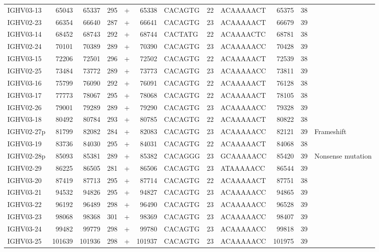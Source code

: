 \begin{tabular}{lrrrlrlllrrl}
  IGHV03-13 & 65043 & 65337 & 295 & + & 65338 & CACAGTG & 22 & ACAAAAACT & 65375 & 38 &  \\ 
  IGHV02-23 & 66354 & 66640 & 287 & + & 66641 & CACAGTG & 23 & ACAAAAACT & 66679 & 39 &  \\ 
  IGHV03-14 & 68452 & 68743 & 292 & + & 68744 & CACTATG & 22 & ACAAAACTC & 68781 & 38 &  \\ 
  IGHV02-24 & 70101 & 70389 & 289 & + & 70390 & CACAGTG & 23 & ACAAAAACC & 70428 & 39 &  \\ 
  IGHV03-15 & 72206 & 72501 & 296 & + & 72502 & CACAGTG & 22 & ACAAAAACT & 72539 & 38 &  \\ 
  IGHV02-25 & 73484 & 73772 & 289 & + & 73773 & CACAGTG & 23 & ACAAAAACC & 73811 & 39 &  \\ 
  IGHV03-16 & 75799 & 76090 & 292 & + & 76091 & CACAGTG & 22 & ACAAAAACT & 76128 & 38 &  \\ 
  IGHV03-17 & 77773 & 78067 & 295 & + & 78068 & CACAGTG & 22 & ACAAAAACT & 78105 & 38 &  \\ 
  IGHV02-26 & 79001 & 79289 & 289 & + & 79290 & CACAGTG & 23 & ACAAAAACC & 79328 & 39 &  \\ 
  IGHV03-18 & 80492 & 80784 & 293 & + & 80785 & CACAGTG & 22 & ACAAAAACT & 80822 & 38 &  \\ 
  IGHV02-27p & 81799 & 82082 & 284 & + & 82083 & CACAGTG & 23 & ACAAAAACC & 82121 & 39 & Frameshift \\ 
  IGHV03-19 & 83736 & 84030 & 295 & + & 84031 & CACAGTG & 22 & ACAAAAACT & 84068 & 38 &  \\ 
  IGHV02-28p & 85093 & 85381 & 289 & + & 85382 & CACAGGG & 23 & GCAAAAACC & 85420 & 39 & Nonsense mutation \\ 
  IGHV02-29 & 86225 & 86505 & 281 & + & 86506 & CACAGTG & 23 & ATAAAAACC & 86544 & 39 &  \\ 
  IGHV03-20 & 87419 & 87713 & 295 & + & 87714 & CACAGTG & 22 & ACAAAAACT & 87751 & 38 &  \\ 
  IGHV03-21 & 94532 & 94826 & 295 & + & 94827 & CACAGTG & 23 & ACAAAAACC & 94865 & 39 &  \\ 
  IGHV03-22 & 96192 & 96489 & 298 & + & 96490 & CACAGTG & 23 & ACAAAAACC & 96528 & 39 &  \\ 
  IGHV03-23 & 98068 & 98368 & 301 & + & 98369 & CACAGTG & 23 & ACAAAAACC & 98407 & 39 &  \\ 
  IGHV03-24 & 99482 & 99779 & 298 & + & 99780 & CACAGTG & 23 & ACAAAAACC & 99818 & 39 &  \\ 
  IGHV03-25 & 101639 & 101936 & 298 & + & 101937 & CACAGTG & 23 & ACAAAAACC & 101975 & 39 &  \\ 

\end{tabular}

